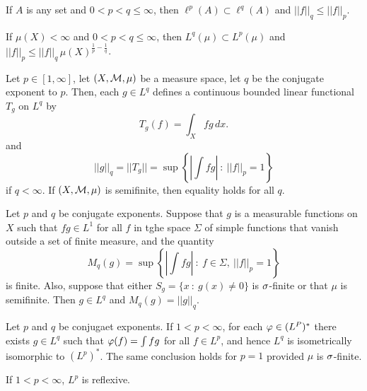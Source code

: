 \vs

\begin{prop}
If $A$ is any set and $0< p < q \leq \infty$, then $\ell^p(A)\subset \ell^q(A)$ and $||f||_q\leq ||f||_p$.
\end{prop}

\vs

\begin{prop}
If $\mu(X) < \infty$ and $0< p < q \leq \infty$, then $L^q(\mu)\subset L^p(\mu)$ and $||f||_p\leq||f||_q\,\mu(X)^{\frac{1}{p}-\frac{1}{q}}$.
\end{prop}

\vs

\begin{prop}
Let $p\in[1,\infty]$, let $(X, \mathcal{M}, \mu)$ be a measure space, let $q$ be the conjugate exponent to $p$. Then, each $g\in L^q$ defines a continuous bounded linear functional $T_g$ on $L^q$ by
\[T_g(f) = \int_X fg\,dx.\]
and
\[||g||_q = ||T_g|| = \sup\left\{\left|\int fg\right|\ :\ ||f||_p = 1\right\}\]
if $q < \infty$. If $(X,\mathcal{M},\mu)$ is semifinite, then equality holds for all $q$.
\end{prop}

\vs

\begin{prop}
Let $p$ and $q$ be conjugate exponents. Suppose that $g$ is a measurable functions on $X$ such that $fg\in L^1$ for all $f$ in tghe space $\Sigma$ of simple functions that vanish outside a set of finite measure, and the quantity
\[M_q(g) = \sup\left\{\left|\int fg\right|\ :\ f\in \Sigma,\ ||f||_p = 1\right\}\]
is finite. Also, suppose that either $S_g = \{x\ :\ g(x)\neq 0\}$ is $\sigma$-finite or that $\mu$ is semifinite. Then $g\in L^q$ and $M_q(g) = ||g||_q$.
\end{prop}

\vs

\begin{thm}
Let $p$ and $q$ be conjugaet exponents. If $1 < p < \infty$, for each $\varphi\in (L^P)^*$ there exists $g\in L^q$ such that $\varphi(f) = \int fg$ for all $f\in L^p$, and hence $L^q$ is isometrically isomorphic to $(L^p)^*$. The same conclusion holds for $p = 1$ provided $\mu$ is $\sigma$-finite.
\end{thm}

\vs

\begin{cor}
If $1 < p < \infty$, $L^p$ is reflexive.
\end{cor}

\vs

